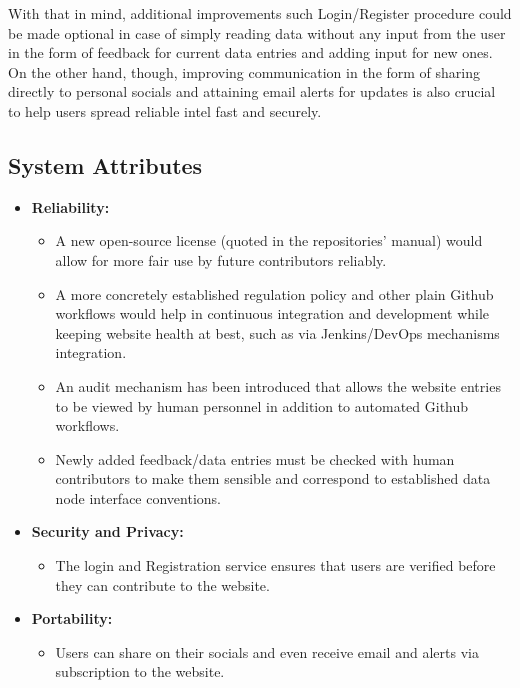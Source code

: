 With that in mind, additional improvements such Login/Register procedure could be made optional in case of simply reading data without any input from the user in the form of feedback for current data entries and adding input for new ones. On the other hand, though, improving communication in the form of sharing directly to personal socials and attaining email alerts for updates is also crucial to help users spread reliable intel fast and securely.

\subsection{System Attributes}

\begin{itemize}
  \item \textbf{Reliability:}
    \begin{itemize}[label=$\blacksquare$]
      \item A new open-source license (quoted in the repositories’ manual) would allow for more fair use by future contributors reliably.
      \item A more concretely established regulation policy and other plain Github workflows would help in continuous integration and development while keeping website health at best, such as via Jenkins/DevOps mechanisms integration.
      \item An audit mechanism has been introduced that allows the website entries to be viewed by human personnel in addition to automated Github workflows.
      \item Newly added feedback/data entries must be checked with human contributors to make them sensible and correspond to established data node interface conventions.
    \end{itemize}

  \vspace*{\fill}
  \newpage

  \item \textbf{Security and Privacy:}
    \begin{itemize}[label=$\blacksquare$]
      \item The login and Registration service ensures that users are verified before they can contribute to the website.
    \end{itemize}
  \item \textbf{Portability:}
    \begin{itemize}[label=$\blacksquare$]
      \item Users can share on their socials and even receive email and alerts via subscription to the website.
    \end{itemize}
\end{itemize}

